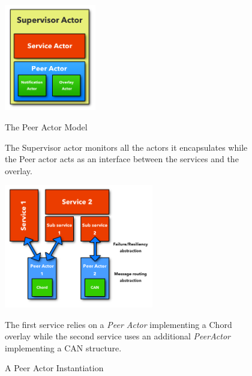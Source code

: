 \begin{figure}
  \begin{minipage}[c]{.35\linewidth}
	\vspace*{.5cm}
   \hspace*{-0.5cm}
      	\centering \includegraphics[width=4cm]{./FIGS/these_supervisor.png}

   \hspace*{0.5cm}
	\vspace*{.4cm}
		\caption{The Peer Actor Model}
		{\small The Supervisor actor monitors all the actors it encapsulates while the Peer actor acts as an interface between the services and the overlay.}
\label{fig:supervisor}
   \end{minipage}
\hspace*{0.6cm}
   \begin{minipage}[c]{.55\linewidth}
   	\centering \includegraphics[width=6.5cm]{./FIGS/these_service_peer_archi_legend.png}
	\vspace*{-0.25cm}
		\caption{A Peer Actor Instantiation}
		\label{fig:peeractor} 
{\small The first service relies on a \emph{Peer Actor} implementing a Chord
overlay while the second service uses an additional \emph{PeerActor} implementing a CAN structure.}
  \end{minipage} \hfill
\end{figure}

